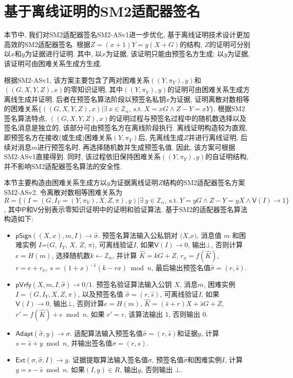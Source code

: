 \documentclass[review]{jcr}
\begin{document}
\section{基于离线证明的SM2适配器签名} 

本节中, 我们对SM2适配器签名SM2-ASv1进一步优化, 基于离线证明技术设计更加高效的SM2适配器签名. 根据$Z=(x+1)Y=y(X+G)$的结构, $Z$的证明可分别以$x$和$y$为证据进行证明. 其中, 以$x$为证据, 该证明只能由预签名方生成; 以$y$为证据, 该证明可由困难关系生成方生成. 

根据SM2-ASv1, 该方案主要包含了两对困难关系$((Y, \pi_Y),y)$和$((G,X,Y,Z),x)$的零知识证明, 其中$((Y, \pi_Y),y)$的证明可由困难关系生成方离线生成并证明, 后者在预签名算法阶段以预签名私钥$x$为证据, 证明离散对数相等的困难关系$\{((G,X,Y,Z),x)|\exists\ x\in \mathbb{Z}_n,\ \text{s.t.}\ X=xG \wedge Z-Y=xY\}$. 根据SM2签名算法特点, $((G,X,Y,Z),x)$的证明过程与预签名过程中的随机数选择以及签名消息是独立的, 该部分可由预签名方在离线阶段执行.  离线证明构造较为直观, 即预签名方在接收(或生成)困难关系$(Y,\pi_Y)$后, 先离线生成$Z$并进行离线证明, 后续对消息$m$进行预签名时, 再选择随机数并生成预签名值. 因此, 该方案可根据SM2-ASv1直接得到. 同时, 该过程依旧保持困难关系$((Y,\pi_Y),y)$的自证明结构, 并不影响SM2适配器签名算法的安全性.

本节主要构造由困难关系生成方以$y$为证据离线证明$Z$结构的SM2适配器签名方案SM2-ASv2. 令离散对数相等困难关系为
$R= \{(I=(G,I_Y=(Y,\pi_Y),X,Z,\pi),y)|\exists\ y\in \mathbb{Z}_n,\ \text{s.t.}\ Y = yG \wedge Z-Y = yX\wedge \mathsf{V}(I) \rightarrow 1\}$, 其中$\mathsf{P}$和$\mathsf{V}$分别表示零知识证明中的证明和验证算法. 基于SM2的适配器签名算法构造如下: 

\begin{itemize}
\item $\mathsf{pSign}((X,x),m,I)\rightarrow \hat{\sigma}$. 预签名算法输入公私钥对 $(X$,$x)$, 消息值 $m$ 和困难实例 $I$=$(G$, $I_Y$, $X$, $Z$, $\pi)$, 可离线验证$I$, 如果$\mathsf{V}(I)\rightarrow 0$, 输出$\bot$, 否则计算 $e=H(m)$, 选择随机数$k\leftarrow \mathbb{Z}_n$, 并计算 $\hat{K}=kG+Z$, $r_x=f(\hat{K})$, $r=e+r_x$, $\hat{s}=(1+x)^{-1}(k-rx) \bmod n$, 最后输出预签名值$\hat{\sigma}=(r,\hat{s})$.

\item $\mathsf{pVrfy}(X,m,I,\hat{\sigma})\rightarrow 0/1$. 预签名验证算法输入公钥 $X$, 消息$m$, 困难实例$I=(G,I_Y,X,Z,\pi)$, 以及预签名值 $\hat{\sigma}=(r,\hat{s})$, 可离线验证$I$, 如果$\mathsf{V}(I)\rightarrow 0$, 输出$\bot$,  否则计算$e=H(m)$, $\hat{K}=(\hat{s}+r)X+\hat{s}G+Z$, $r'=f(\hat{K})+e \bmod n$. 如果 $r'=r$, 该算法输出 $1$, 否则输出 $0$. 

\item $\mathsf{Adapt}(\hat{\sigma},y)\rightarrow \sigma$. 适配算法输入预签名值$\hat{\sigma}=(r,\hat{s})$和证据$y$, 计算$s=\hat{s}+y \bmod n$, 并输出签名值$\sigma=(r,s)$. 

\item $\mathsf{Ext}(\sigma,\hat{\sigma},I)\rightarrow y$. 证据提取算法输入签名值$\sigma$, 预签名值$\hat{\sigma}$和困难实例$I$, 计算$y=s-\hat{s} \bmod n$. 如果$(I, y)\in R$, 输出$y$, 否则输出 $\bot$. 
\end{itemize}
\end{document}
